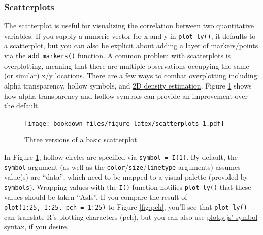 \documentclass[12pt,]{isuthesis}
\newenvironment{Shaded}{\begin{snugshade}}{\end{snugshade}}
\newcommand{\KeywordTok}[1]{\textcolor[rgb]{0.13,0.29,0.53}{\textbf{{#1}}}}
\newcommand{\DataTypeTok}[1]{\textcolor[rgb]{0.13,0.29,0.53}{{#1}}}
\newcommand{\DecValTok}[1]{\textcolor[rgb]{0.00,0.00,0.81}{{#1}}}
\newcommand{\FloatTok}[1]{\textcolor[rgb]{0.00,0.00,0.81}{{#1}}}
\newcommand{\StringTok}[1]{\textcolor[rgb]{0.31,0.60,0.02}{{#1}}}
\newcommand{\NormalTok}[1]{{#1}}
\begin{document}
\hypertarget{scatterplots}{\subsubsection{Scatterplots}\label{scatterplots}}

The scatterplot is useful for visualizing the correlation between two
quantitative variables. If you supply a numeric vector for x and y in
\texttt{plot\_ly()}, it defaults to a scatterplot, but you can also be
explicit about adding a layer of markers/points via the
\texttt{add\_markers()} function. A common problem with scatterplots is
overplotting, meaning that there are multiple observations occupying the
same (or similar) x/y locations. There are a few ways to combat
overplotting including: alpha transparency, hollow symbols, and
\protect\hyperlink{rectangular-binning-in-R}{2D density estimation}.
Figure \ref{fig:scatterplots} shows how alpha transparency and hollow
symbols can provide an improvement over the default.

\begin{Shaded}
\end{Shaded}

\begin{figure}[htbp]
\centering
\texttt{[image: bookdown\_files/figure-latex/scatterplots-1.pdf]}
\caption{\label{fig:scatterplots}Three versions of a basic scatterplot}
\end{figure}

In Figure \ref{fig:scatterplots}, hollow circles are specified via
\texttt{symbol\ =\ I(1)}. By default, the \texttt{symbol} argument (as
well as the \texttt{color}/\texttt{size}/\texttt{linetype} arguments)
assumes value(s) are ``data'', which need to be mapped to a visual
palette (provided by \texttt{symbols}). Wrapping values with the
\texttt{I()} function notifies \texttt{plot\_ly()} that these values
should be taken ``AsIs''. If you compare the result of
\texttt{plot(1:25,\ 1:25,\ pch\ =\ 1:25)} to Figure \ref{fig:pch},
you'll see that \texttt{plot\_ly()} can translate R's plotting
characters (pch), but you can also use
\href{https://plot.ly/r/reference/\#scatter-marker-symbol}{plotly.js'
symbol syntax}, if you desire.
\end{document}
